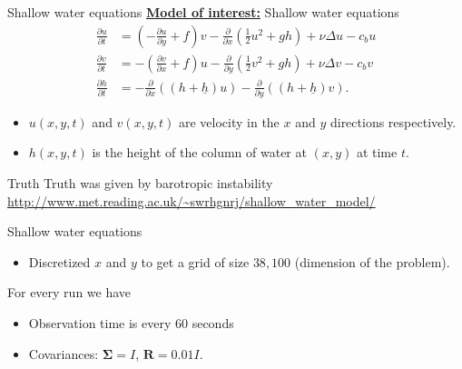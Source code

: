 \documentclass[aspectratio=169]{beamer}
\newcommand{\modelcovariance}{\boldsymbol{\Sigma}}
\newcommand{\observationcovariance}{\boldsymbol{R}}
\begin{document}
\begin{frame}{Shallow water equations}
\vfill
    \textbf{\underline{Model of interest:}} Shallow water equations
    \begin{align*}
        \frac{\partial u}{\partial t} &= \left(-\frac{\partial u}{\partial y} + f\right) v - \frac{\partial}{\partial x} \left(\frac{1}{2} u^2 +gh\right) + \nu \Delta u - c_b u\\
        \frac{\partial v}{\partial t} &= -\left(\frac{\partial v}{\partial x}+f\right) u - \frac{\partial}{\partial y} \left(\frac{1}{2} v^2 +gh\right) + \nu \Delta v - c_b v\\
        \frac{\partial h}{\partial t} &= -\frac{\partial}{\partial x} ((h+\underline{h})u)-\frac{\partial}{\partial y} ((h+\underline{h})v).
    \end{align*}

    \begin{itemize}
        \item $u(x,y,t)$ and $v(x,y,t)$ are velocity in the $x$ and $y$ directions respectively.
        \item $h(x,y,t)$ is the height of the column of water at $(x,y)$ at time $t$.
    \end{itemize}
\vfill
\end{frame}


\begin{frame}{Truth}
\vfill
    Truth was given by barotropic instability \url{http://www.met.reading.ac.uk/~swrhgnrj/shallow_water_model/}
\vfill
\end{frame}


\begin{frame}{Shallow water equations}
\vfill
    \begin{itemize}
        \item Discretized $x$ and $y$ to get a grid of size $38,100$ (dimension of the problem).
    \end{itemize}

For every run we have
    \begin{itemize}
        \item Observation time is every 60 seconds
        \item Covariances: $\modelcovariance = I$, $\observationcovariance = 0.01I$.
    \end{itemize}
\vfill
\end{frame}
\end{document}
